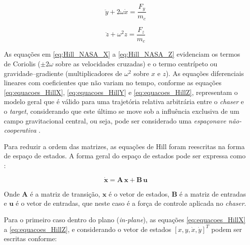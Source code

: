 \begin{equation}
    \label{eq:Hill_NASA_Y}
    \ddot{y} + 2\omega \dot{x} = \frac{F_y}{m_c}
\end{equation}

\begin{equation}
    \label{eq:Hill_NASA_Z}
    \ddot{z} + \omega^2 z = \frac{F_z}{m_c}
\end{equation}

As equações em \eqref{eq:Hill_NASA_X} a \eqref{eq:Hill_NASA_Z} evidenciam os termos de Coriolis ($\pm2\omega$ sobre as velocidades cruzadas) e o termo centrípeto ou gravidade--gradiente (multiplicadores de $\omega^2$ sobre $x$ e $z$).
As equações diferenciais lineares com coeficientes que não variam no tempo, conforme as equações \eqref{eq:equacoes_HillX}, \eqref{eq:equacoes_HillY} e \eqref{eq:equacoes_HillZ}, representam o modelo geral que é válido para uma trajetória relativa arbitrária \cite{debruijn2011,ortolano2017} entre o \emph{chaser} e o \emph{target}, considerando que este último se move sob a influência exclusiva de um campo gravitacional central, ou seja, pode ser considerado uma \emph{espaçonave não-cooperativa} \cite{mahendrakar2023}.

Para reduzir a ordem das matrizes, as equações de Hill foram reescritas na forma de espaço de estados.
A forma geral do espaço de estados pode ser expressa como \cite{fehse2003,starek2016,sherrill2014}:

\begin{equation}
    \dot{\mathbf{x}} = \mathbf{A}\,\mathbf{x} + \mathbf{B}\,\mathbf{u}
    \label{eq:state_space_general}
\end{equation}

Onde $\mathbf{A}$ é a matriz de transição, $\mathbf{x}$ é o vetor de estados, $\mathbf{B}$ é a matriz de entradas e $\mathbf{u}$ é o vetor de entradas, que neste caso é a força de controle aplicada no \emph{chaser}.

Para o primeiro caso dentro do plano (\textit{in-plane}), as equações \eqref{eq:equacoes_HillX} a \eqref{eq:equacoes_HillZ}, e considerando o vetor de estados
$[x, y, \dot{x}, \dot{y}]^T$ podem ser escritas conforme:

